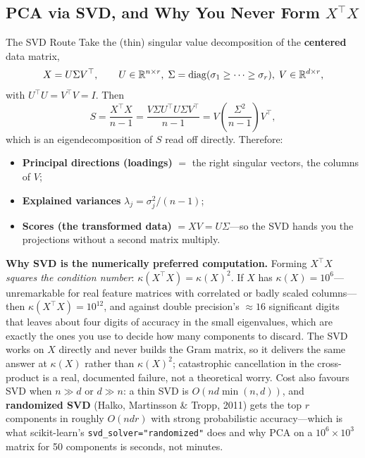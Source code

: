 \subsection{PCA via SVD, and Why You Never Form $X^\top X$}

\begin{mathresult}{The SVD Route}
Take the (thin) singular value decomposition of the \textbf{centered} data matrix,
\begin{equation}
X = U \Sigma V^\top, \qquad U \in \mathbb{R}^{n \times r},\; \Sigma = \operatorname{diag}(\sigma_1 \ge \cdots \ge \sigma_r) ,\; V \in \mathbb{R}^{d \times r},
\end{equation}
with $U^\top U = V^\top V = I$. Then
\begin{equation}
S = \frac{X^\top X}{n-1} = \frac{V \Sigma U^\top U \Sigma V^\top}{n-1} = V \left(\frac{\Sigma^2}{n-1}\right) V^\top ,
\end{equation}
which is an eigendecomposition of $S$ read off directly. Therefore:
\begin{itemize}
    \item \textbf{Principal directions (loadings)} $=$ the right singular vectors, the columns of $V$;
    \item \textbf{Explained variances} $\lambda_j = \sigma_j^2/(n-1)$;
    \item \textbf{Scores (the transformed data)} $= XV = U\Sigma$---so the SVD hands you the projections without a second matrix multiply.
\end{itemize}
\end{mathresult}

\textbf{Why SVD is the numerically preferred computation.} Forming $X^\top X$ \emph{squares the condition number}: $\kappa(X^\top X) = \kappa(X)^2$. If $X$ has $\kappa(X) = 10^6$---unremarkable for real feature matrices with correlated or badly scaled columns---then $\kappa(X^\top X) = 10^{12}$, and against double precision's $\approx 16$ significant digits that leaves about four digits of accuracy in the small eigenvalues, which are exactly the ones you use to decide how many components to discard. The SVD works on $X$ directly and never builds the Gram matrix, so it delivers the same answer at $\kappa(X)$ rather than $\kappa(X)^2$; catastrophic cancellation in the cross-product is a real, documented failure, not a theoretical worry. Cost also favours SVD when $n \gg d$ or $d \gg n$: a thin SVD is $O(nd\min(n,d))$, and \textbf{randomized SVD} (Halko, Martinsson \& Tropp, 2011) gets the top $r$ components in roughly $O(ndr)$ with strong probabilistic accuracy---which is what scikit-learn's \texttt{svd\_solver="randomized"} does and why PCA on a $10^6 \times 10^3$ matrix for 50 components is seconds, not minutes.

